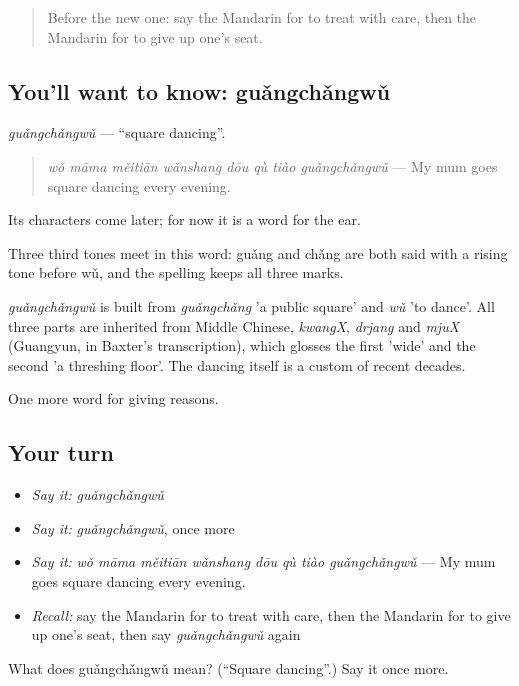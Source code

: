 \label{lesson:ZH-C376-guangchangwu}



\begin{quote}
Before the new one: say the Mandarin for to treat with care, then the Mandarin for to give up one's seat.
\end{quote}

\subsection*{You'll want to know: guǎngchǎngwǔ}
\emph{guǎngchǎngwǔ} — \textquotedblleft{}square dancing\textquotedblright{}.

\begin{quote}
\emph{wǒ māma měitiān wǎnshang dōu qù tiào guǎngchǎngwǔ} — My mum goes square dancing every evening.
\end{quote}

Its characters come later; for now it is a word for the ear.

Three third tones meet in this word: guǎng and chǎng are both said with a rising tone before wǔ, and the spelling keeps all three marks.

\begin{cousinweb}
\emph{guǎngchǎngwǔ} is built from \emph{guǎngchǎng} 'a public square' and \emph{wǔ} 'to dance'. All three parts are inherited from Middle Chinese, \emph{kwangX}, \emph{drjang} and \emph{mjuX} (Guangyun, in Baxter's transcription), which glosses the first 'wide' and the second 'a threshing floor'. The dancing itself is a custom of recent decades.
\end{cousinweb}

\begin{grammarlens}[title={What you've built}]
One more word for giving reasons.
\end{grammarlens}

\subsection*{Your turn}
\begin{itemize}
\raggedright
  \item \emph{Say it:} \emph{guǎngchǎngwǔ}
  \item \emph{Say it:} \emph{guǎngchǎngwǔ}, once more
  \item \emph{Say it:} \emph{wǒ māma měitiān wǎnshang dōu qù tiào guǎngchǎngwǔ} — My mum goes square dancing every evening.
  \item \emph{Recall:} say the Mandarin for to treat with care, then the Mandarin for to give up one's seat, then say \emph{guǎngchǎngwǔ} again
\end{itemize}

\begin{tcolorbox}[breakable,colback=teal!4,colframe=teal!35!black,title={Before you move on}]
What does guǎngchǎngwǔ mean? (\textquotedblleft{}Square dancing\textquotedblright{}.) Say it once more.
\end{tcolorbox}
